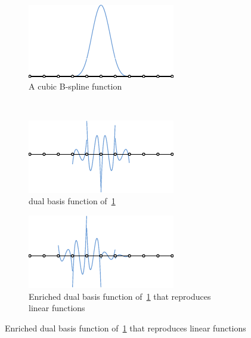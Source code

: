 \begin{figure}[ht]
	\center
	\begin{subfigure}[t]{.45\linewidth}
		\center
		\includegraphics[width=.9\columnwidth]{p=3}
		\caption{A cubic B-spline function}\label{fig:a_cubic_spline}
	\end{subfigure}\\
	\begin{subfigure}[t]{.45\linewidth}
		\center
		\includegraphics[width=.9\columnwidth]{p=3_c=0}
		\caption{\Bezier dual basis function of~\ref{fig:a_cubic_spline}}
	\end{subfigure}\hfil
	\begin{subfigure}[t]{.45\linewidth}
		\center
		\includegraphics[width=.9\columnwidth]{p=3_c=1}
		\caption{Enriched \Bezier dual basis function of~\ref{fig:a_cubic_spline} that reproduces linear functions}

\end{subfigure}
\end{figure}
